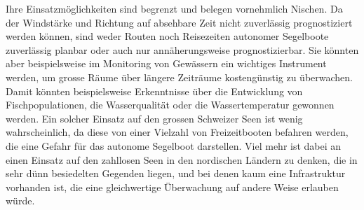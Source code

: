 Ihre Einsatzmöglichkeiten sind begrenzt und belegen vornehmlich Nischen. Da der Windstärke und Richtung auf absehbare Zeit nicht zuverlässig prognostiziert werden können, sind weder Routen noch Reisezeiten autonomer Segelboote zuverlässig planbar oder auch nur annäherungsweise prognostizierbar. Sie könnten aber beispielsweise im Monitoring von Gewässern ein wichtiges Instrument werden, um grosse Räume über  längere Zeiträume kostengünstig zu überwachen. Damit könnten beispielsweise Erkenntnisse über die Entwicklung von Fischpopulationen, die Wasserqualität oder die Wassertemperatur gewonnen werden. Ein solcher Einsatz auf den grossen Schweizer Seen ist wenig wahrscheinlich, da diese von einer Vielzahl von Freizeitbooten befahren werden, die eine Gefahr für das autonome Segelboot darstellen. Viel mehr ist dabei an einen Einsatz auf den zahllosen Seen in den nordischen Ländern zu denken, die in sehr dünn besiedelten Gegenden liegen, und bei denen kaum eine Infrastruktur vorhanden ist, die eine gleichwertige Überwachung auf andere Weise erlauben würde.      
